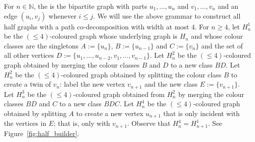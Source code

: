 \begin{example}\label{eg:half_graphs}
    For $n\in\mathbb{N}$, the  is the bipartite graph with parts $u_1,\ldots,u_n$ and $v_1,\ldots,v_n$ and an edge $(u_i,v_j)$ whenever $i\leq j$. We will use the above grammar to construct all half graphs with a path co-decomposition with width at most $4$. For $n\ge 4$, let $H_n^1$ be the $(\le 4)$-coloured graph whose underlying graph is $H_n$ and whose colour classes are the singletons $A:=\{u_{n}\}$, $B:=\{u_{n-1}\}$ and $C:=\{v_n\}$ and the set of all other vertices $D:=\{u_1,\ldots,u_{n-2},v_1,\ldots,v_{n-1}\}$. Let $H_n^2$ be the $(\le 4)$-coloured graph obtained by merging the colour classes $B$ and $D$ to a new class $BD$. Let $H_n^2$ be the $(\le 4)$-coloured graph obtained by splitting the colour class $B$ to create a twin of $v_n$: label the new vertex $v_{n+1}$ and the new class $E:=\{v_{n+1}\}$. Let $H_n^3$ be the $(\le 4)$-coloured graph obtained from $H_n^2$ by merging the colour classes $BD$ and $C$ to a new class $BDC$. Let $H_n^4$ be the $(\le 4)$-coloured graph obtained by splitting $A$ to create a new vertex $u_{n+1}$ that is only incident with the vertices in $E$; that is, only with $v_{n+1}$. Observe that $H_n^4=H_{n+1}^1$. See Figure~\ref{fig:half_builder}.
\end{example}

